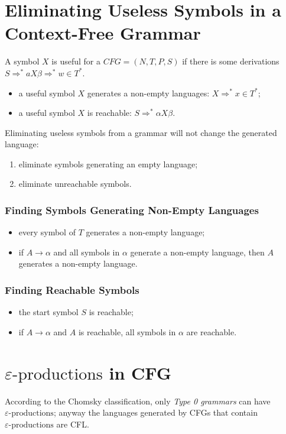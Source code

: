 \section{Eliminating Useless Symbols in a Context-Free Grammar}
A symbol $X$ is useful for a $CFG = (N, T, P, S)$ if there is some derivations $S \Rightarrow^\ast aX\beta \Rightarrow^\ast w \in T^\ast$.
\begin{itemize}
	\item a useful symbol $X$ generates a non-empty languages: $X \Rightarrow^\ast x \in T^\ast$;
	\item a useful symbol $X$ is reachable: $S \Rightarrow^\ast \alpha X\beta$.
\end{itemize}
Eliminating useless symbols from a grammar will not change the generated language:
\begin{enumerate}
	\item eliminate symbols generating an empty language;
	\item eliminate unreachable symbols.
\end{enumerate}
\subsubsection{Finding Symbols Generating Non-Empty Languages}
\begin{itemize}
	\item every symbol of $T$ generates a non-empty language;
	\item if $A \to \alpha$ and all symbols in $\alpha$ generate a non-empty language, then $A$ generates a non-empty language.
\end{itemize}
\subsubsection{Finding Reachable Symbols}
\begin{itemize}
	\item the start symbol $S$ is reachable;
	\item if $A \to \alpha$ and $A$ is reachable, all symbols in $\alpha$ are reachable.
\end{itemize}

\section{$\varepsilon\text{-productions}$ in CFG}
According to the Chomsky classification, only \emph{Type 0 grammars} can have $\varepsilon\text{-productions}$; anyway the languages generated by CFGs that contain $\varepsilon\text{-productions}$ are CFL.

